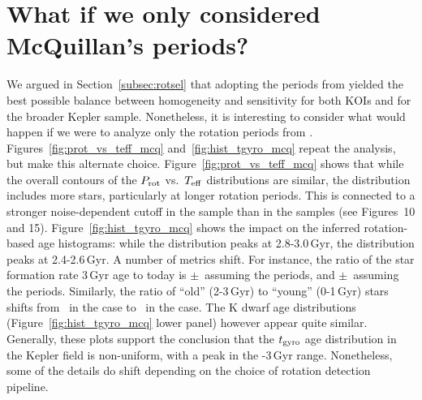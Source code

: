 \documentclass[11pt,twocolumn,tighten]{aastex63}
\begin{document}
\section{What if we only considered McQuillan's periods?}
\label{app:mcqonly}

We argued in Section~\ref{subsec:rotsel} that adopting
the periods from \citet{Santos_2019,Santos_2021} yielded the best
possible balance between homogeneity and sensitivity for both KOIs and
for the broader Kepler sample.  Nonetheless, it is interesting to
consider what would happen if we were to analyze only the rotation
periods from \citet{McQuillan_2014}.
Figures~\ref{fig:prot_vs_teff_mcq} and~\ref{fig:hist_tgyro_mcq} repeat
the analysis, but make this alternate choice.
Figure~\ref{fig:prot_vs_teff_mcq} shows that while the overall
contours of the $P_{\rm rot}$ vs.~$T_{\rm eff}$ distributions are
similar, the \citeauthor{Santos_2019} distribution includes more
stars, particularly at longer rotation periods.  This is connected to
a stronger noise-dependent cutoff in the \citet{McQuillan_2014} sample
than in the \citeauthor{Santos_2019} samples (see
\citealt{Masuda2022_amplevoln} Figures~10 and 15).
Figure~\ref{fig:hist_tgyro_mcq} shows the impact on the inferred
rotation-based age histograms: while the \citeauthor{Santos_2019}
distribution peaks at 2.8-3.0\,Gyr, the \citeauthor{McQuillan_2014}
distribution peaks at 2.4-2.6\,Gyr.  A number of metrics shift.  For
instance, the ratio of the star formation rate 3\,Gyr age to today is
\ratiosfr$\pm$\uncratiosfr\ assuming the \citeauthor{Santos_2019}
periods, and \mcquillanonlyratiosfr$\pm$\mcquillanonlyuncratiosfr\
assuming the \citeauthor{McQuillan_2014} periods.  Similarly, the
ratio of ``old'' (2-3\,Gyr) to ``young'' (0-1\,Gyr) stars shifts from
\ratioobtoybstars\ in the \citeauthor{Santos_2019} case to
\mcquillanonlyratioobtoybstars\ in the \citeauthor{McQuillan_2014}
case.  The K dwarf age distributions (Figure~\ref{fig:hist_tgyro_mcq}
lower panel) however appear quite similar.  Generally, these plots
support the conclusion that the $t_{\rm gyro}$ age distribution in the
Kepler field is non-uniform, with a peak in the \replaced{2.5}{2.3}-3\,Gyr range.
Nonetheless, some of the details do shift depending on the choice of
rotation detection pipeline.
\end{document}
